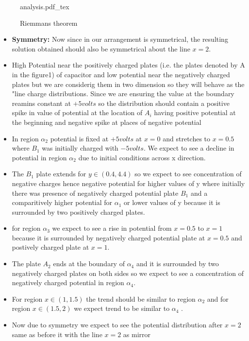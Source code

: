 \begin{figure}[h]
    \centering
    \def\svgwidth{0.6\textwidth}
    {analysis.pdf_tex}
    \caption{Riemmans theorem}
    \label{fig:riemmans-theorem}
\end{figure}
\begin{itemize}
    \item \textbf{Symmetry: } Now since in our arrangement is symmetrical, the resulting solution obtained should also be symmetrical about the line $x = 2$. 
    \item High Potential near the positively charged plates (i.e. the plates denoted by A  in the figure1) of capacitor and low potential near the negatively charged plates but we are considerig them in two dimension so they will behave as the "line charge distributions. Since we are ensuring the value at the boundary reamins constant at $ +5 volts $ so the distribution should contain a positive spike in value of potential at the location of $A_i$  having positive potential at the beginning and negative spike at places of negative potential
    \item  In region $ \alpha_2 $ potential is fixed at $ + 5 volts $ at $ x = 0 $ and stretches to $ x = 0.5 $ where $ B_1 $ was initially charged with $ - 5 volts $. We expect to see a decline in potential in region $ \alpha_2 $ due to initial conditions across x direction.
    \item The  $ B_1 $ plate extends for $ y \in (0.4, 4.4)  $ so we expect to see concentration of negative charges hence negative potential  for  higher values  of y where initially there was presence of negatively charged potential plate $ B_1 $ and a comparitively higher potential for $ \alpha_1 $ or lower values of y because it is surrounded by two positively charged plates.
    \item for region $ \alpha_3   $  we expect to see a rise  in potential from $ x = 0.5 $ to $ x = 1 $  because it is surrounded by negatively charged potential plate at $ x = 0.5 $ and postively charged plate at  $ x = 1 $.
    \item The plate $ A_2 $ ends at the boundary of $ \alpha_4 $ and it is surrounded by two negatively charged plates on both sides so we expect to see a concentration of negatively charged potential in region $ \alpha_4 $.
    \item For region $ x \in (1 , 1.5) $ the trend should be similar to region $ \alpha_2 $ and for region $ x \in (1.5, 2) $ we expect  trend to be similar to $ \alpha_4 $ . 
    \item Now due to symmetry we expect to see the potential distribution after $ x = 2 $ same as before it with the line $ x = 2 $ as mirror
\end{itemize}

